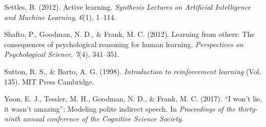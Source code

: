 \documentclass[10pt, letterpaper]{article}
\begin{document}
\hypertarget{ref-settles2012active}{}
Settles, B. (2012). Active learning. \emph{Synthesis Lectures on
Artificial Intelligence and Machine Learning}, \emph{6}(1), 1--114.

\hypertarget{ref-shafto2012learning}{}
Shafto, P., Goodman, N. D., \& Frank, M. C. (2012). Learning from
others: The consequences of psychological reasoning for human learning.
\emph{Perspectives on Psychological Science}, \emph{7}(4), 341--351.

\hypertarget{ref-sutton1998}{}
Sutton, R. S., \& Barto, A. G. (1998). \emph{Introduction to
reinforcement learning} (Vol. 135). MIT Press Cambridge.

\hypertarget{ref-yoon2017}{}
Yoon, E. J., Tessler, M. H., Goodman, N. D., \& Frank, M. C. (2017). ``I
won't lie, it wasn't amazing'': Modeling polite indirect speech. In
\emph{Proceedings of the thirty-ninth annual conference of the Cognitive
Science Society}.
\end{document}
